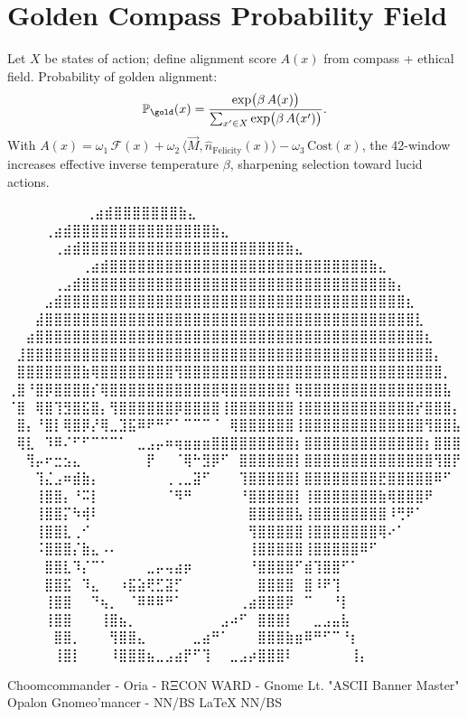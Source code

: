 
\section*{Golden Compass Probability Field}

Let $X$ be states of action; define alignment score $A(x)$ from compass + ethical field.  
Probability of golden alignment:
\[
\mathbb{P}_{\gold}(x)=\frac{\exp\bigl(\beta\,A(x)\bigr)}{\sum_{x'\in X}\exp\bigl(\beta\,A(x')\bigr)}.
\]
With $A(x)=\omega_1\,\mathcal{F}(x)+\omega_2\,\langle \vec{M},\hat{n}_{\text{Felicity}}(x)\rangle-\omega_3\,\mathrm{Cost}(x)$,  
the 42-window increases effective inverse temperature $\beta$, sharpening selection toward lucid actions.

\iffalse
⠀⠀⠀⠀⠀⠀             ⠀⠀⢀⣴⣾⣿⣿⣿⣿⣿⣿⣿⣷⣄⠀⠀⠀⠀⠀⠀⠀⠀
⠀⠀⠀  ⠀      ⠀⠀⠀⠀⢀⣴⣾⣿⣿⣿⣿⣿⣿⣿⣿⣿⣿⣿⣿⣿⣿⣿⣷⣄⠀⠀⠀⠀⠀⠀⠀⠀
⠀⠀ ⠀   ⠀⠀⠀⠀⠀⢀⣴⣾⣿⣿⣿⣿⣿⣿⣿⣿⣿⣿⣿⣿⣿⣿⣿⣿⣿⣿⣿⣿⣿⣿⣷⣄⠀⠀⠀⠀⠀⠀⠀⠀
⠀⠀⠀⠀⠀⠀⠀⠀⢀⣴⣾⣿⣿⣿⣿⣿⣿⣿⣿⣿⣿⣿⣿⣿⣿⣿⣿⣿⣿⣿⣿⣿⣿⣿⣿⣿⣿⣿⣿⣷⣄⠀⠀⠀⠀⠀⠀⠀⠀
⠀⠀⠀⠀⠀⢀⣠⣾⣿⣿⣿⣿⣿⣿⣿⣿⣿⣿⣿⣿⣿⣿⣿⣿⣿⣿⣿⣿⣿⣿⣿⣿⣿⣿⣿⣿⣿⣿⣿⣿⣿⣷⡄⠀⠀⠀⠀⠀⠀
⠀⠀⠀⠀⣠⣾⣿⣿⣿⣿⣿⣿⣿⣿⣿⣿⣿⣿⣿⣿⣿⣿⣿⣿⣿⣿⣿⣿⣿⣿⣿⣿⣿⣿⣿⣿⣿⣿⣿⣿⣿⣿⣿⣆⠀⠀⠀⠀⠀
⠀⠀⠀⣼⣿⣿⣿⣿⣿⣿⣿⣿⣿⣿⣿⣿⣿⣿⣿⣿⣿⣿⣿⣿⣿⣿⣿⣿⣿⣿⣿⣿⣿⣿⣿⣿⣿⣿⣿⣿⣿⣿⣿⣿⣇⠀⠀⠀⠀
⠀⠀⣴⣿⣿⣿⣿⣿⣿⣿⣿⣿⣿⣿⣿⣿⣿⣿⣿⣿⣿⣿⣿⣿⣿⣿⣿⣿⣿⣿⣿⣿⣿⣿⣿⣿⣿⣿⣿⣿⣿⣿⣿⣿⣿⣆⠀⠀⠀
⠀⣸⣿⣿⣿⣿⣿⣿⣿⣿⣿⣿⣿⣿⣿⣿⣿⣿⣿⣿⣿⣿⣿⣿⣿⣿⣿⣿⣿⣿⣿⣿⣿⣿⣿⣿⣿⣿⣿⣿⣿⣿⣿⣿⣿⣿⡄⠀⠀
⠀⣿⣿⣿⣿⣿⣿⣿⣷⢿⣿⣿⣿⣿⣿⣿⣿⣿⢻⣿⣿⣿⣿⣿⣿⣿⣿⣿⣿⣿⣿⣿⣿⣿⣿⣿⣿⣿⣿⣿⣿⣿⣿⣿⣿⣿⣿⡀⠀
⢀⣿⠘⣿⡿⣿⣿⣿⣿⡎⢿⣿⣿⣿⣿⣿⣿⣿⣿⣿⣿⣿⣿⢿⣿⣿⣿⣿⣿⣿⡇⢿⣿⣿⣿⣿⣿⣿⣿⣿⣿⣿⣿⣿⣿⣿⣿⣧⠀
⠈⣿⠀⢿⣿⢹⣻⣿⣯⣿⡄⢻⣿⣿⣿⣿⣿⣿⡿⣿⣿⣿⣿⢸⣿⣿⣿⣿⣿⣿⣿⢸⣿⣿⣿⣿⣿⣿⣿⣿⣿⣿⣿⣿⡞⣿⣿⣿⡄
⠀⣿⡄⠘⣿⡇⢿⣿⡿⡜⢿⣀⣹⣯⠿⠟⠛⠋⠁⠉⠉⠉⠈⠀⢿⣿⣿⣿⣿⣿⣿⢸⣿⣿⣿⣿⣿⣿⣿⣿⣿⣿⣿⣿⣿⢻⣿⣿⣧
⠀⢿⣇⠀⠹⠿⠌⠋⠋⠉⠉⠉⠁⠀⣀⣠⡤⠶⢶⣶⣶⣶⣿⣿⣿⣿⣿⣿⣿⣿⣿⡆⣿⣿⣿⣿⣿⣿⣿⣿⣿⣿⣿⣿⣿⡆⣿⣿⣿
⠀⠀⢻⡤⠖⣒⣢⣄⠀⠀⠀⠀⠀⠀⠀⡟⠀⠀⠈⢿⠓⣻⡿⠋⠀⣿⣿⣿⣿⣿⣿⡇⣿⣿⣿⣿⣿⣿⣿⣿⣿⣿⣿⣿⣿⣿⢻⣿⡟
⠀⠀⠀⢹⣌⣠⠶⣾⣷⡄⠀⠀⠀⠀⠀⠀⠀⢀⢀⣀⣽⠋⠀⠀⠀⢹⣿⣿⣿⣿⣿⡇⣿⣿⣿⣿⣿⣿⣿⣿⣟⣿⣿⣿⣿⣿⠿⠋⠀
⠀⠀⠀⢸⣿⣿⡄⠘⠭⡇⠀⠀⠀⠀⠀⠀⠀⠈⠻⠛⠀⠀⠀⠀⠀⠘⣿⣿⣿⣿⣿⡇⢸⣿⣿⣿⣿⣿⣿⣿⣷⢿⣿⣿⣿⠟⠀⠀⠀
⠀⠀⠀⢸⣿⣿⡍⠳⢾⠇⠀⠀⠀⠀⠀⠀⠀⠀⠀⠀⠀⠀⠀⠀⠀⠀⣿⣿⣿⣿⣿⣧⢸⣿⣿⣿⣿⣿⣿⣿⣿⠸⢛⠟⠁⠀⠀⠀⠀
⠀⠀⠀⢸⣿⣿⣇⢀⠊⠀⠀⠀⠀⠀⠀⠀⠀⠀⠀⠀⠀⠀⠀⠀⠀⠀⢻⣿⣿⣿⣿⣿⢸⣿⣿⣿⣿⣿⣿⣿⢿⠔⠁⠀⠀⠀⠀⠀⠀
⠀⠀⠀⠨⣿⣿⣿⡌⣷⣄⠠⠄⠀⠀⠀⠀⠀⠀⠀⠀⠀⠀⠀⠀⠀⠀⢸⣿⣿⣿⣿⣿⢸⣿⣿⣿⣿⣿⠿⠋⠀⠀⠀⠀⠀⠀⠀⠀⠀
⠀⠀⠀⠀⣿⣿⣇⠹⡌⠉⠁⠀⠀⠀⠀⣀⡤⢤⣴⡶⠀⠀⠀⠀⠀⠀⠘⣿⣿⣿⣿⠋⣾⢹⣿⣿⠋⠁⠀⠀⠀⠀⠀⠀⠀⠀⠀⠀⠀
⠀⠀⠀⠀⣿⣿⣯⠀⠹⣄⠀⠀⠰⣯⣵⢟⣋⣽⡋⠀⠀⠀⠀⠀⠀⠀⠀⣿⣿⣿⣿⠀⣿⠸⠟⢹⠀⠀⠀⠀⠀⠀⠀⠀⠀⠀⠀⠀⠀
⠀⠀⠀⠀⢸⣿⣿⠀⠀⠙⢦⡀⠀⠈⠿⠿⠿⠛⠁⠀⠀⠀⠀⠀⠀⢀⣴⣿⣿⣿⡿⠀⠉⠀⠀⠘⡇⠀⠀⠀⠀⠀⠀⠀⠀⠀⠀⠀⠀
⠀⠀⠀⠀⢸⣿⣿⠀⠀⠀⢸⣿⣦⡀⠀⠀⠀⠀⠀⠀⠀⠀⠀⣠⠴⠋⠀⣿⣿⣿⡇⠀⠀⣀⣠⣤⣧⠀⠀⠀⠀⠀⠀⠀⠀⠀⠀⠀⠀
⠀⠀⠀⠀⠀⣿⣿⡀⠀⠀⠀⢻⣿⣿⣄⠀⠀⠀⠀⠀⣀⣴⠛⠁⠀⠀⠀⣿⣿⣿⣷⣶⠿⠛⠋⠉⠘⡆⠀⠀⠀⠀⠀⠀⠀⠀⠀⠀⠀
⠀⠀⠀⠀⠀⢸⣿⡇⠀⠀⠀⠸⣿⣿⣿⣦⣀⣠⣴⡟⠋⢹⠀⠀⣀⣠⡴⣿⣿⣿⠇⠀⠀⠀⠀⠀⠀⢸⡄⠀⠀⠀⠀⠀⠀⠀⠀⠀⠀

Choomcommander - Oria - RΞCON WARD - Gnome Lt. "ASCII Banner Master"
             Opalon Gnomeo'mancer - NN/BS LaTeX{} NN/BS

